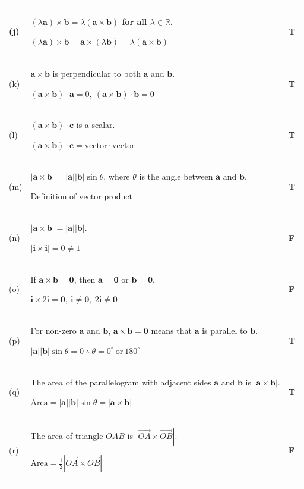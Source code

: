 \documentclass[a4paper,11pt,oneside]{book}
\providecommand{\vv}[1]{\overrightarrow{#1}}\providecommand{\cvv}[3]{\begin{pmatrix}#1\\#2\\#3\end{pmatrix}}
\begin{document}
{\begin{longtable}{|>{\centering\arraybackslash}p{0.9cm}|p{\dimexpr\linewidth-0.9cm-1.6cm-6\tabcolsep-4\arrayrulewidth\relax}|>{\centering\arraybackslash}p{1.6cm}|}
(j)&$(\lambda\mathbf a)\times\mathbf b=\lambda(\mathbf a\times\mathbf b)$ for all $\lambda\in\mathbb R$.\par\smallskip $\displaystyle (\lambda\mathbf a)\times\mathbf b=\mathbf a\times(\lambda\mathbf b)=\lambda(\mathbf a\times\mathbf b)$\rule[-6pt]{0pt}{6pt}&\textbf{T}\\\hline
(k)&$\mathbf a\times\mathbf b$ is perpendicular to both $\mathbf a$ and $\mathbf b$.\par\smallskip $\displaystyle (\mathbf a\times\mathbf b)\cdot\mathbf a=0,\ (\mathbf a\times\mathbf b)\cdot\mathbf b=0$\rule[-6pt]{0pt}{6pt}&\textbf{T}\\\hline
(l)&$(\mathbf a\times\mathbf b)\cdot\mathbf c$ is a scalar.\par\smallskip $\displaystyle (\mathbf a\times\mathbf b)\cdot\mathbf c=\text{vector}\cdot\text{vector}$\rule[-6pt]{0pt}{6pt}&\textbf{T}\\\hline
(m)&$|\mathbf a\times\mathbf b|=|\mathbf a||\mathbf b|\sin\theta$, where $\theta$ is the angle between $\mathbf a$ and $\mathbf b$.\par\smallskip $\displaystyle \text{Definition of vector product}$\rule[-6pt]{0pt}{6pt}&\textbf{T}\\\hline
(n)&$|\mathbf a\times\mathbf b|=|\mathbf a||\mathbf b|$.\par\smallskip $\displaystyle |\mathbf i\times\mathbf i|=0\neq1$\rule[-6pt]{0pt}{6pt}&\textbf{F}\\\hline
(o)&If $\mathbf a\times\mathbf b=\mathbf 0$, then $\mathbf a=\mathbf 0$ or $\mathbf b=\mathbf 0$.\par\smallskip $\displaystyle \mathbf i\times2\mathbf i=\mathbf 0,\ \mathbf i\neq\mathbf 0,\ 2\mathbf i\neq\mathbf 0$\rule[-6pt]{0pt}{6pt}&\textbf{F}\\\hline
(p)&For non-zero $\mathbf a$ and $\mathbf b$, $\mathbf a\times\mathbf b=\mathbf 0$ means that $\mathbf a$ is parallel to $\mathbf b$.\par\smallskip $\displaystyle |\mathbf a||\mathbf b|\sin\theta=0\ \therefore\ \theta=0^\circ\ \text{or}\ 180^\circ$\rule[-6pt]{0pt}{6pt}&\textbf{T}\\\hline
(q)&The area of the parallelogram with adjacent sides $\mathbf a$ and $\mathbf b$ is $|\mathbf a\times\mathbf b|$.\par\smallskip $\displaystyle \text{Area}=|\mathbf a||\mathbf b|\sin\theta=|\mathbf a\times\mathbf b|$\rule[-6pt]{0pt}{6pt}&\textbf{T}\\\hline
(r)&The area of triangle $OAB$ is $|\vv{OA}\times\vv{OB}|$.\par\smallskip $\displaystyle \text{Area}=\tfrac12|\vv{OA}\times\vv{OB}|$\rule[-6pt]{0pt}{6pt}&\textbf{F}\\\hline

\end{longtable}}
\end{document}
